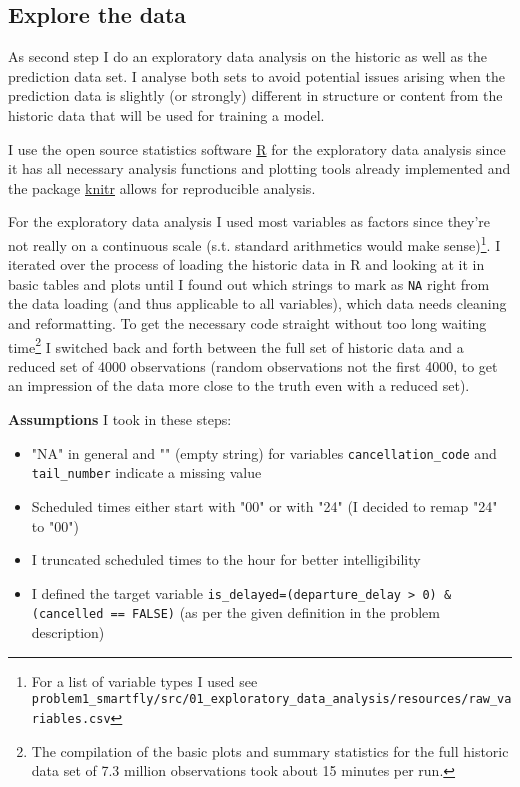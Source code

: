 \documentclass{article}\usepackage[]{graphicx}\usepackage[]{color}
\begin{document}



\subsection{Explore the data} %
\label{sub:explore_data}

As second step I do an exploratory data analysis on the historic as well as the prediction data set. I analyse both sets to avoid potential issues arising when the prediction data is slightly (or strongly) different in structure or content from the historic data that will be used for training a model. 

I use the open source statistics software \href{http://www.r-project.org/}{R} for the exploratory data analysis since it has all necessary analysis functions and plotting tools already implemented and the package \href{http://yihui.name/knitr/}{knitr} allows for reproducible analysis.

For the exploratory data analysis I used most variables as factors since they're not really on a continuous scale (s.t. standard arithmetics would make sense)\footnote{For a list of variable types I used see \verb+problem1_smartfly/src/01_exploratory_data_analysis/resources/raw_variables.csv+}.
I iterated over the process of loading the historic data in R and looking at it in basic tables and plots until I found out which strings to mark as \verb+NA+ right from the data loading (and thus applicable to all variables), which data needs cleaning and reformatting. To get the necessary code straight without too long waiting time\footnote{The compilation of the basic plots and summary statistics for the full historic data set of 7.3 million observations took about 15 minutes per run.} I switched back and forth between the full set of historic data and a reduced set of 4000 observations (random observations not the first 4000, to get an impression of the data more close to the truth even with a reduced set).

\textbf{Assumptions} I took in these steps: 
\begin{itemize}
	\item "NA" in general and "" (empty string) for variables \verb+cancellation_code+ and \verb+tail_number+ indicate a missing value
	\item Scheduled times either start with "00" or with "24" (I decided to remap "24" to "00")
	\item I truncated scheduled times to the hour for better intelligibility
	\item I defined the target variable \verb+is_delayed=(departure_delay > 0) & (cancelled == FALSE)+ (as per the given definition in the problem description)
\end{itemize}
\end{document}
